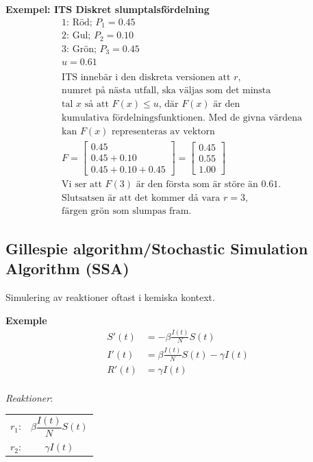 \begin{multicols}{2}
\textbf{Exempel: ITS Diskret slumptalsfördelning}
\begin{align*}
  &\text{1: Röd; } P_1 = 0.45 \\
  &\text{2: Gul; } P_2 = 0.10 \\
  &\text{3: Grön; } P_3 = 0.45 \\
  &u=0.61 \\
  \\
  &\text{ITS innebär i den diskreta versionen att $r$,} \\
  &\text{numret på nästa utfall, ska väljas som det minsta} \\
  &\text{tal $x$ så att } F(x)\leq u \text{, där $F(x)$ är den} \\
  &\text{kumulativa fördelningsfunktionen. Med de givna värdena} \\
  &\text{kan $F(x)$ representeras av vektorn} \\
  &F = 
  \begin{bmatrix}
    0.45 \\
    0.45 + 0.10 \\
    0.45 + 0.10 + 0.45 
  \end{bmatrix} =
  \begin{bmatrix}
    0.45 \\
    0.55 \\
    1.00 
  \end{bmatrix} \\
  &\text{Vi ser att $F(3)$ är den första som är störe än $0.61$.} \\
  &\text{Slutsatsen är att det kommer då vara $r=3$,} \\
  &\text{färgen grön som slumpas fram.}
\end{align*}


\subsection{Gillespie algorithm/Stochastic Simulation Algorithm (SSA)}
Simulering av reaktioner oftast i kemiska kontext.

\textbf{Exemple}
\begin{align*}
    S'(t) &= -\beta\frac{I(t)}{N}S(t) \\
    I'(t) &= \beta\frac{I(t)}{N}S(t) -\gamma I(t) \\
    R'(t) &= \gamma I(t) \\
\end{align*}

\textit{Reaktioner}:
\begin{center}
\begin{tabular}{ c c }
 $r_1$: & $\beta\dfrac{I(t)}{N}S(t)$  \\  
 $r_2$: & $\gamma I(t)$  \\    
\end{tabular}
\end{center}


\end{multicols}
